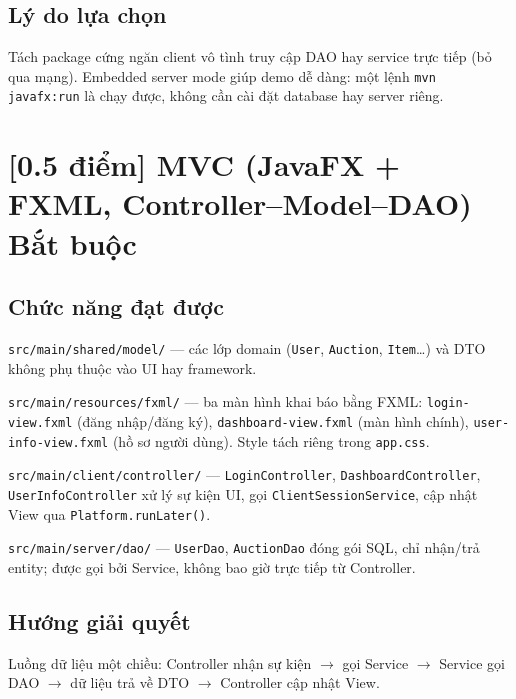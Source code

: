 \documentclass[12pt,a4paper]{article}
\newcommand{\score}[1]{\textbf{[#1 điểm]}}
\newcommand{\mandatory}{\textcolor{mandatorycolor}{\textbf{Bắt buộc}}}
\newcommand{\filepath}[1]{\texttt{\small #1}}
\begin{document}
\subsection*{Lý do lựa chọn}
Tách package cứng ngăn client vô tình truy cập DAO hay service trực tiếp (bỏ qua mạng). Embedded server mode giúp demo dễ dàng: một lệnh \texttt{mvn javafx:run} là chạy được, không cần cài đặt database hay server riêng.

\section{\score{0.5} MVC (JavaFX + FXML, Controller–Model–DAO) \hfill \mandatory}

\subsection*{Chức năng đạt được}

\begin{description}[leftmargin=2em, style=nextline]
  \item[\textbf{Model}]
    \filepath{src/main/shared/model/} — các lớp domain (\texttt{User}, \texttt{Auction}, \texttt{Item}…) và DTO không phụ thuộc vào UI hay framework.

  \item[\textbf{View}]
    \filepath{src/main/resources/fxml/} — ba màn hình khai báo bằng FXML:
    \texttt{login-view.fxml} (đăng nhập/đăng ký), \texttt{dashboard-view.fxml} (màn hình chính), \texttt{user-info-view.fxml} (hồ sơ người dùng). Style tách riêng trong \texttt{app.css}.

  \item[\textbf{Controller}]
    \filepath{src/main/client/controller/} — \texttt{LoginController}, \texttt{DashboardController}, \texttt{UserInfoController} xử lý sự kiện UI, gọi \texttt{ClientSessionService}, cập nhật View qua \texttt{Platform.runLater()}.

  \item[\textbf{DAO}]
    \filepath{src/main/server/dao/} — \texttt{UserDao}, \texttt{AuctionDao} đóng gói SQL, chỉ nhận/trả entity; được gọi bởi Service, không bao giờ trực tiếp từ Controller.
\end{description}

\subsection*{Hướng giải quyết}
Luồng dữ liệu một chiều: Controller nhận sự kiện $\to$ gọi Service $\to$ Service gọi DAO $\to$ dữ liệu trả về DTO $\to$ Controller cập nhật View.
\end{document}

